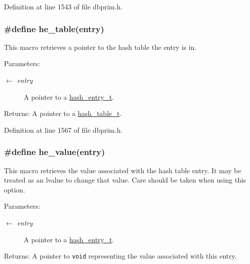 Definition at line 1543 of file dbprim.h.\hypertarget{group__dbprim__hash_ga42}{
\subsubsection[he\_\-table]{\setlength{\rightskip}{0pt plus 5cm}\#define he\_\-table(entry)}}
\label{group__dbprim__hash_ga42}


This macro retrieves a pointer to the hash table the entry is in.

\begin{Desc}
\item[Parameters:]
\begin{description}
\item[\mbox{$\leftarrow$} {\em entry}]A pointer to a \hyperlink{group__dbprim__hash_ga2}{hash\_\-entry\_\-t}.\end{description}
\end{Desc}
\begin{Desc}
\item[Returns:]A pointer to a \hyperlink{group__dbprim__hash_ga1}{hash\_\-table\_\-t}.\end{Desc}


Definition at line 1567 of file dbprim.h.\hypertarget{group__dbprim__hash_ga45}{
\subsubsection[he\_\-value]{\setlength{\rightskip}{0pt plus 5cm}\#define he\_\-value(entry)}}
\label{group__dbprim__hash_ga45}


This macro retrieves the value associated with the hash table entry. It may be treated as an lvalue to change that value. Care should be taken when using this option.

\begin{Desc}
\item[Parameters:]
\begin{description}
\item[\mbox{$\leftarrow$} {\em entry}]A pointer to a \hyperlink{group__dbprim__hash_ga2}{hash\_\-entry\_\-t}.\end{description}
\end{Desc}
\begin{Desc}
\item[Returns:]A pointer to {\tt void} representing the value associated with this entry.\end{Desc}



